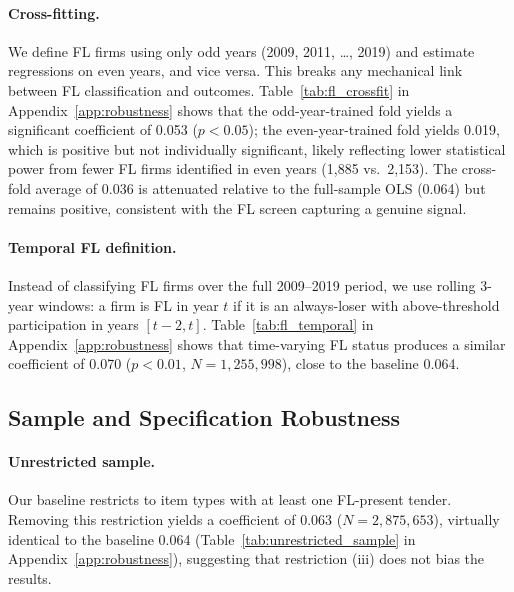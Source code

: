\paragraph{Cross-fitting.}
We define FL firms using only odd years (2009, 2011, \ldots, 2019) and
estimate regressions on even years, and vice versa. This breaks any
mechanical link between FL classification and outcomes.
Table~\ref{tab:fl_crossfit} in Appendix~\ref{app:robustness} shows that
the odd-year-trained fold yields a significant coefficient of 0.053
($p < 0.05$); the even-year-trained fold yields 0.019, which is
positive but not individually significant, likely reflecting lower
statistical power from fewer FL firms identified in even years (1,885
vs.\ 2,153). The cross-fold average of 0.036 is attenuated relative to
the full-sample OLS (0.064) but remains positive, consistent with the
FL screen capturing a genuine signal.

\paragraph{Temporal FL definition.}
Instead of classifying FL firms over the full 2009--2019 period, we use
rolling 3-year windows: a firm is FL in year $t$ if it is an
always-loser with above-threshold participation in years $[t-2, t]$.
Table~\ref{tab:fl_temporal} in Appendix~\ref{app:robustness} shows %
that time-varying FL status produces a similar coefficient of 0.070
($p < 0.01$, $N = 1{,}255{,}998$), close to the baseline 0.064.

\subsection{Sample and Specification Robustness}

\paragraph{Unrestricted sample.}
Our baseline restricts to item types with at least one FL-present
tender. Removing this restriction yields a coefficient of 0.063 ($N =
2{,}875{,}653$), virtually identical to the baseline 0.064
(Table~\ref{tab:unrestricted_sample} in Appendix~\ref{app:robustness}),
suggesting that restriction (iii) does not bias the results. %

